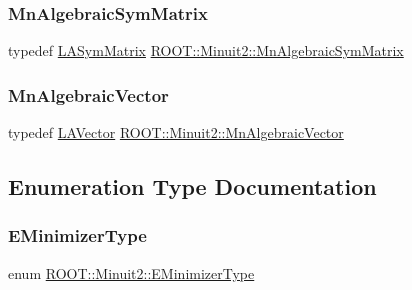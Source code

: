 \subsubsection{\texorpdfstring{MnAlgebraicSymMatrix}{MnAlgebraicSymMatrix}}
{\footnotesize\ttfamily typedef \mbox{\hyperlink{classROOT_1_1Minuit2_1_1LASymMatrix}{L\+A\+Sym\+Matrix}} \mbox{\hyperlink{namespaceROOT_1_1Minuit2_a9e74ad97f5537a2e80e52b04d98ecc6e}{R\+O\+O\+T\+::\+Minuit2\+::\+Mn\+Algebraic\+Sym\+Matrix}}}

\mbox{\label{namespaceROOT_1_1Minuit2_a62ed97730a1ca8d3fbaec64a19aa11c9}} 
\subsubsection{\texorpdfstring{MnAlgebraicVector}{MnAlgebraicVector}}
{\footnotesize\ttfamily typedef \mbox{\hyperlink{classROOT_1_1Minuit2_1_1LAVector}{L\+A\+Vector}} \mbox{\hyperlink{namespaceROOT_1_1Minuit2_a62ed97730a1ca8d3fbaec64a19aa11c9}{R\+O\+O\+T\+::\+Minuit2\+::\+Mn\+Algebraic\+Vector}}}



\subsection{Enumeration Type Documentation}
\mbox{\label{namespaceROOT_1_1Minuit2_abdfae3dff24b1dc5a23955c06fe2a8d6}} 
\subsubsection{\texorpdfstring{EMinimizerType}{EMinimizerType}\hspace{0.1cm}{\footnotesize\ttfamily [1/3]}}
{\footnotesize\ttfamily enum \mbox{\hyperlink{namespaceROOT_1_1Minuit2_abdfae3dff24b1dc5a23955c06fe2a8d6}{R\+O\+O\+T\+::\+Minuit2\+::\+E\+Minimizer\+Type}}}

